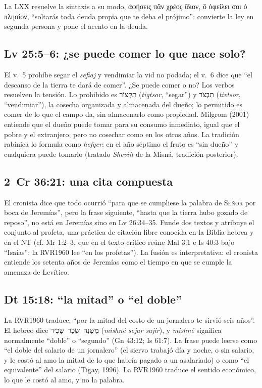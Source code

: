 \documentclass[11pt,letterpaper]{article}
\newcommand{\heb}[1]{\mbox{\foreignlanguage{hebrew}{#1}}}
\newcommand{\grc}[1]{\foreignlanguage{ancientgreek}{#1}}
\newcommand{\SENOR}{\textsc{Señor}}
\begin{document}
La LXX resuelve la sintaxis a su modo, \grc{ἀφήσεις πᾶν χρέος ἴδιον, ὃ ὀφείλει σοι ὁ πλησίον}, ``soltarás toda deuda propia que te deba el prójimo'': convierte la ley en segunda persona y pone el acento en la deuda.

\subsection{Lv 25:5--6: ¿se puede comer lo que nace solo?}
El v.~5 prohíbe segar el \emph{sefiaj} y vendimiar la vid no podada; el v.~6 dice que ``el descanso de la tierra te dará de comer''. ¿Se puede comer o no? Los verbos resuelven la tensión. Lo prohibido es \heb{תִקְצוֹר} (\emph{tiqtsor}, ``segar'') y \heb{תִבְצֹר} (\emph{tivtsor}, ``vendimiar''), la cosecha organizada y almacenada del dueño; lo permitido es comer de lo que el campo da, sin almacenarlo como propiedad. Milgrom (2001) entiende que el dueño puede tomar para su consumo inmediato, igual que el pobre y el extranjero, pero no cosechar como en los otros años. La tradición rabínica lo formula como \emph{hefqer}: en el año séptimo el fruto es ``sin dueño'' y cualquiera puede tomarlo (tratado \emph{Sheviít} de la Misná, tradición posterior).

\subsection{2~Cr 36:21: una cita compuesta}
El cronista dice que todo ocurrió ``para que se cumpliese la palabra de \SENOR{} por boca de Jeremías'', pero la frase siguiente, ``hasta que la tierra hubo gozado de reposo'', no está en Jeremías sino en Lv 26:34--35. Funde dos textos y atribuye el conjunto al profeta, una práctica de citación libre conocida en la Biblia hebrea y en el NT (cf. Mr 1:2--3, que en el texto crítico reúne Mal 3:1 e Is 40:3 bajo ``Isaías''; la RVR1960 lee ``en los profetas''). La fusión es interpretativa: el cronista entiende los setenta años de Jeremías como el tiempo en que se cumple la amenaza de Levítico.

\subsection{Dt 15:18: ``la mitad'' o ``el doble''}
La RVR1960 traduce: ``por la mitad del costo de un jornalero te sirvió seis años''. El hebreo dice \heb{מִשְׁנֶה שְׂכַר שָׂכִיר} (\emph{mishné sejar sajir}), y \emph{mishné} significa normalmente ``doble'' o ``segundo'' (Gn 43:12; Is 61:7). La frase puede leerse como ``el doble del salario de un jornalero'' (el siervo trabajó día y noche, o sin salario, y le costó al amo la mitad de lo que habría pagado a un asalariado) o como ``el equivalente'' del salario (Tigay, 1996). La RVR1960 traduce el sentido económico, lo que le costó al amo, y no la palabra.
\end{document}
